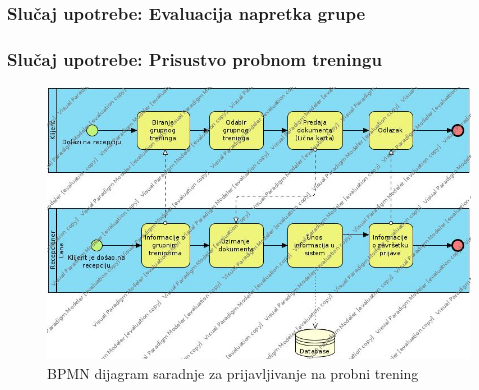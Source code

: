 \documentclass[../main.tex]{subfiles}
\begin{document}
\subsubsection{Slučaj upotrebe: Evaluacija napretka grupe}


\subsubsection{Slučaj upotrebe: Prisustvo probnom treningu}


\begin{figure}[!ht]
\begin{center}
\includegraphics[scale=0.45]{sections/images/bpmn_probni_trening.jpg}
\end{center}
\caption{BPMN dijagram saradnje za prijavljivanje na probni trening}
\label{fig:kontekst}
\end{figure}
\end{document}
